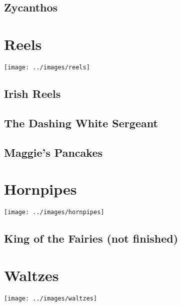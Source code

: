 \documentclass[12pt]{report}
\newcommand*{\cleartoleftpage}{%
  \clearpage
   \ifodd\value{page}\hbox{}\newpage\fi
}
\begin{document}
\cleartoleftpage
\section*{Zycanthos}


\cleartoleftpage
\chapter*{Reels}
\begin{center}
\texttt{[image: ../images/reels]}
\end{center}

\section*{Irish Reels}


\cleartoleftpage
\section*{The Dashing White Sergeant}


\cleartoleftpage
\section*{Maggie's Pancakes}


\cleartoleftpage
\chapter*{Hornpipes}
\begin{center}
\texttt{[image: ../images/hornpipes]}
\end{center}

\section*{King of the Fairies (not finished)}


\cleartoleftpage
\chapter*{Waltzes}
\begin{center}
\texttt{[image: ../images/waltzes]}
\end{center}
\end{document}
